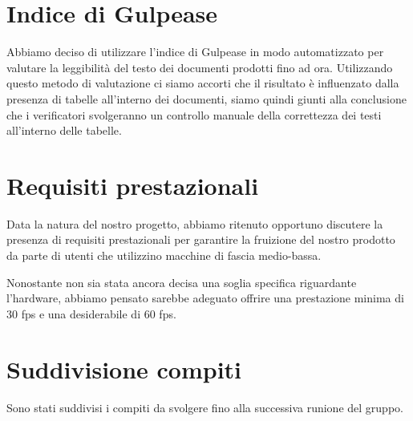 \section{Indice di Gulpease}
Abbiamo deciso di utilizzare l'indice di Gulpease in modo automatizzato per valutare la leggibilità del testo dei documenti prodotti fino ad ora. \tabularnewline
Utilizzando questo metodo di valutazione ci siamo accorti che il risultato è influenzato dalla presenza di tabelle all'interno dei documenti, siamo quindi giunti alla conclusione che i verificatori svolgeranno un controllo manuale della correttezza dei testi all'interno delle tabelle.

\section{Requisiti prestazionali}
Data la natura del nostro progetto, abbiamo ritenuto opportuno discutere la presenza di requisiti prestazionali per garantire la fruizione del nostro prodotto da parte di utenti che utilizzino macchine di fascia medio-bassa. \tabularnewline

Nonostante non sia stata ancora decisa una soglia specifica riguardante l'hardware, abbiamo pensato sarebbe adeguato offrire una prestazione minima di 30 fps e una desiderabile di 60 fps.

\section{Suddivisione compiti}
Sono stati suddivisi i compiti da svolgere fino alla successiva runione del gruppo.
 